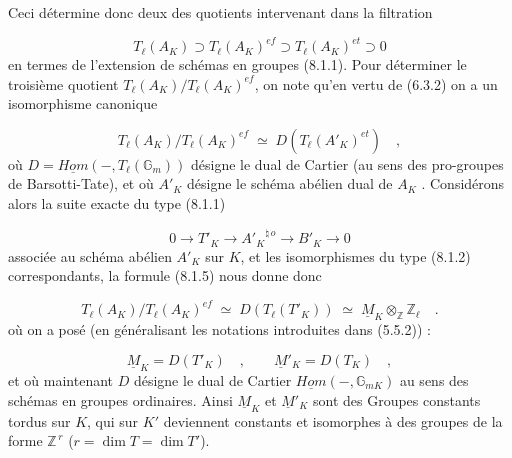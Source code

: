 
Ceci détermine donc deux des quotients intervenant dans la filtration

\begin{equation}\tag{8.1.4}
T_\ell(A_K) \supset T_\ell(A_K)^{ef} \supset T_\ell(A_K)^{et} \supset 0
\end{equation}
en termes de l'extension de schémas en groupes (8.1.1). Pour déterminer le troisième quotient $T_\ell(A_K)/T_\ell(A_K)^{ef}$, on note qu'en vertu de (6.3.2) on a un isomorphisme canonique

\begin{equation}\tag{8.1.5}
T_\ell(A_K)/T_\ell(A_K)^{ef} \;\simeq\; D(T_\ell(A'_K)^{et}) \quad ,
\end{equation}
où $D = \underline{Hom}( - , T_\ell(\mathbb{G}_m))$ désigne le dual de Cartier (au sens des pro-groupes de Barsotti-Tate), et où $A'_K$ désigne le schéma abélien dual de $A_K$ . Considérons alors la suite exacte du type (8.1.1)

\begin{equation}\tag{8.1.6}
0 \longrightarrow T'_K \longrightarrow {A'_K}^{\natural\,o} \longrightarrow B'_K \longrightarrow 0
\end{equation}
associée au schéma abélien $A'_K$ sur $K$, et les isomorphismes du type (8.1.2) correspondants, la formule (8.1.5) nous donne donc

\begin{equation}\tag{8.1.7}
T_\ell(A_K)/T_\ell(A_K)^{ef} \;\simeq\; D(T_\ell(T'_K)) \;\simeq\; \underline{M}_K \otimes_{\mathbb{Z}} \mathbb{Z}_\ell \quad .
\end{equation}
où on a posé (en généralisant les notations introduites dans (5.5.2)) :

\begin{equation}\tag{8.1.8}
\underline{M}_K = D(T'_K) \quad , \qquad \underline{M}'_K = D(T_K) \quad ,
\end{equation}
et où maintenant $D$ désigne le dual de Cartier $\underline{Hom}( - , \mathbb{G}_{mK})$ au sens des schémas en groupes ordinaires. Ainsi $\underline{M}_K$ et $\underline{M}'_K$ sont des Groupes constants tordus sur $K$, qui sur $K'$ deviennent constants et isomorphes à des groupes de la forme $\mathbb{Z}^{\,r}$ ($r=\dim T = \dim T'$).



